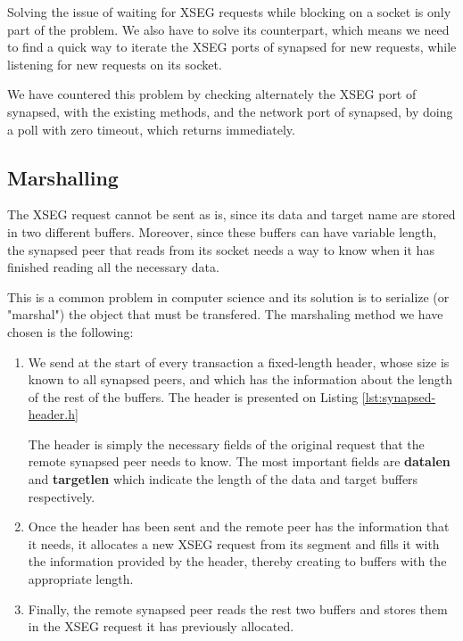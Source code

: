 Solving the issue of waiting for XSEG requests while blocking on a socket is 
only part of the problem. We also have to solve its counterpart, which means we 
need to find a quick way to iterate the XSEG ports of synapsed for new 
requests, while listening for new requests on its socket.

We have countered this problem by checking alternately the XSEG port of 
synapsed, with the existing methods, and the network port of synapsed, by doing 
a poll with zero timeout, which returns immediately.

\subsection{Marshalling}

The XSEG request cannot be sent as is, since its data and target name are 
stored in two different buffers. Moreover, since these buffers can have 
variable length, the synapsed peer that reads from its socket needs a way to 
know when it has finished reading all the necessary data.

This is a common problem in computer science and its solution is to serialize 
(or "marshal") the object that must be transfered. The marshaling method we 
have chosen is the following:

\begin{enumerate}
	\item We send at the start of every transaction a fixed-length header, 
		whose size is known to all synapsed peers, and which has the 
		information about the length of the rest of the buffers.  The 
		header is presented on Listing \ref{lst:synapsed-header.h}


		The header is simply the necessary fields of the original 
		request that the remote synapsed peer needs to know. The most 
		important fields are \textbf{datalen} and \textbf{targetlen} 
		which indicate the length of the data and target buffers 
		respectively.
	\item Once the header has been sent and the remote peer has the 
		information that it needs, it allocates a new XSEG request from 
		its segment and fills it with the information provided by the 
		header, thereby creating to buffers with the appropriate 
		length.
	\item Finally, the remote synapsed peer reads the rest two buffers and 
		stores them in the XSEG request it has previously allocated.
\end{enumerate}

